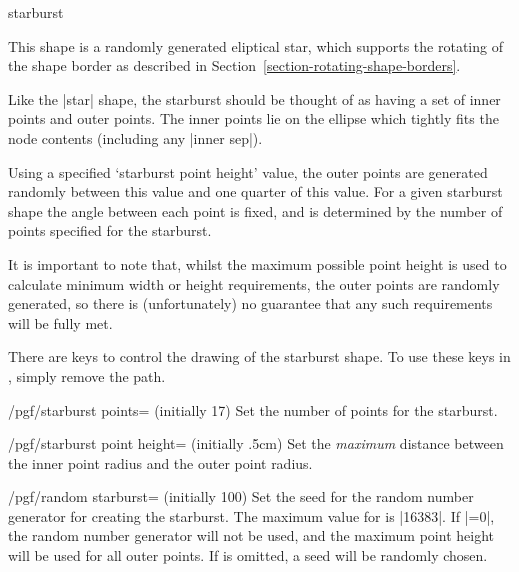 \begin{shape}{starburst}

	This shape is a randomly generated eliptical star,
	which supports the rotating of the shape border as described in 
	Section~\ref{section-rotating-shape-borders}. 
\begin{codeexample}[]
\end{codeexample}	
	Like the |star| shape, the starburst should be thought of as having a set
	of inner points and outer points. The inner points lie on the ellipse
	which tightly fits the node contents (including any |inner sep|).
	
	Using a specified `starburst point height' value, the outer points
	are generated randomly between this value and one quarter of this 
	value. For a given starburst shape the angle between each point is 
	fixed, and is determined by the number of points specified for
	the starburst.
	
	It is important to note that, whilst the maximum possible point 
	height is used to calculate minimum width or height requirements, 
	the outer points are randomly generated, so there is (unfortunately) 
	no guarantee that any such requirements will be fully met. 
	
\begin{codeexample}[]
\end{codeexample}

	There are \pgfname{} keys to control the drawing of the starburst
	shape. To use these keys in \tikzname,	simply remove the 
		path.

	\begin{key}{/pgf/starburst points= (initially 17)}
		Set the number of points for the starburst.
	\end{key}
	\begin{key}{/pgf/starburst point height= (initially .5cm)}
      Set the \emph{maximum} distance between the inner point radius  
      and the outer point radius.
	\end{key}
	
	\begin{key}{/pgf/random starburst= (initially 100)}
      Set the seed for the random number generator for creating the
      starburst.  The maximum value for  is |16383|.
      If |=0|, the random number generator will not be 
      used, and the maximum point height will be used for all outer 
      points. If  is omitted, a seed will be randomly
      chosen.
	\end{key}
	

\end{shape}

